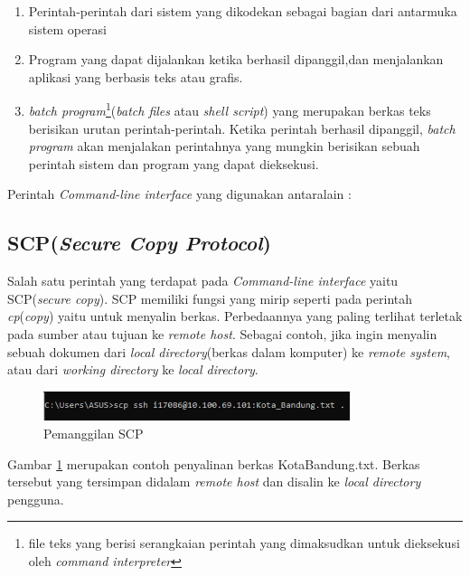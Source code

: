 \begin{enumerate}
	\item Perintah-perintah dari sistem yang dikodekan sebagai bagian dari antarmuka sistem operasi
	\item Program yang dapat dijalankan ketika berhasil dipanggil,dan menjalankan aplikasi yang berbasis teks atau grafis.
	\item \textit{batch program}\footnote{file teks yang berisi serangkaian perintah yang dimaksudkan untuk dieksekusi oleh \textit{command interpreter}}(\textit{batch files} atau \textit{shell script}) yang merupakan berkas teks berisikan urutan perintah-perintah. Ketika perintah berhasil dipanggil, \textit{batch program} akan menjalakan perintahnya yang mungkin berisikan sebuah perintah sistem dan program yang dapat dieksekusi.
\end{enumerate}
Perintah \textit{Command-line interface} yang digunakan antaralain :
\subsection{SCP(\textit{Secure Copy Protocol})}
Salah satu perintah yang terdapat pada \textit{Command-line interface} yaitu SCP(\textit{secure copy}). SCP memiliki fungsi yang mirip seperti pada perintah \emph{cp}(\textit{copy}) yaitu untuk menyalin berkas\cite{william:19:linux}. Perbedaannya yang paling terlihat terletak pada sumber atau tujuan ke \textit{remote host}. Sebagai contoh, jika ingin menyalin sebuah dokumen dari \textit{local directory}(berkas dalam komputer) ke \textit{remote system}, atau dari \textit{working directory} ke \textit{local directory}. 

\begin{figure}[H]
	\centering
	\includegraphics[width=0.8\textwidth]{Gambar/scp.png}
	\caption{Pemanggilan SCP}
	\label{fig:scp}
\end{figure}

Gambar \ref{fig:scp} merupakan contoh penyalinan berkas Kota\textunderscore Bandung.txt. Berkas tersebut yang tersimpan didalam \textit{remote host} dan disalin ke \textit{local directory} pengguna.


